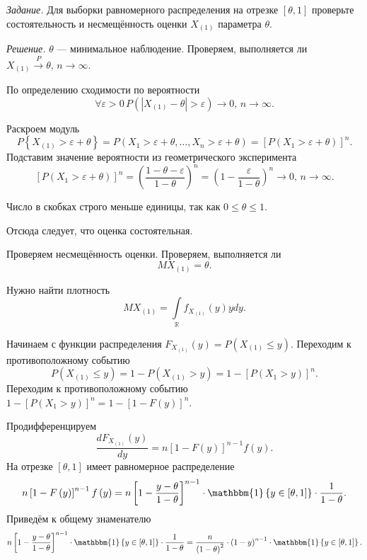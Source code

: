 \textit{Задание.}
Для выборки равномерного распределения на отрезке $ \left[ \theta , 1 \right] $
проверьте состоятельность и несмещённость оценки $X_{ \left( 1 \right) }$ параметра $ \theta $.

\textit{Решение.} $ \theta $ --- минимальное наблюдение.
Проверяем,
выполняется ли $X_{ \left( 1 \right) } \overset{P}{ \rightarrow } \theta, \, n \to \infty $.

По определению сходимости по вероятности
$$ \forall \varepsilon > 0 \,
  P \left( \left| X_{ \left( 1 \right) } - \theta \right| > \varepsilon \right) \to 0, \,
  n \to \infty.$$

Раскроем модуль
$$P \left\{ X_{ \left( 1 \right) } > \varepsilon + \theta \right\} =
  P \left( X_1 > \varepsilon + \theta, \dotsc, X_n > \varepsilon + \theta \right) =
  \left[ P \left( X_1 > \varepsilon + \theta \right) \right]^n.$$
Подставим значение вероятности из геометрического эксперимента
$$ \left[ P \left( X_1 > \varepsilon + \theta \right) \right]^n =
  \left( \frac{1 - \theta - \varepsilon }{1 - \theta } \right)^n =
  \left( 1 - \frac{ \varepsilon }{1 - \theta } \right)^n \to
  0, \,
  n \to \infty.$$

Число в скобках строго меньше единицы, так как $0 \leq \theta \leq 1$.

Отсюда следует, что оценка состоятельная.

Проверяем несмещённость оценки.
Проверяем, выполняется ли
$$MX_{ \left( 1 \right) } =
  \theta.$$

Нужно найти плотность
$$MX_{ \left( 1 \right) } =
  \int \limits_{ \mathbb{R}} f_{X_{ \left( 1 \right) }} \left( y \right) ydy.$$

Начинаем с функции распределения
$F_{X_{ \left( 1 \right) }} \left( y \right) =
  P \left( X_{ \left( 1 \right) } \leq y \right) $.
Переходим к противоположному событию
$$P \left( X_{ \left( 1 \right) } \leq y \right) =
  1 - P \left( X_{ \left( 1 \right) } > y \right) =
  1 - \left[ P \left( X_1 > y \right) \right]^n.$$
Переходим к противоположному событию
$1 - \left[ P \left( X_1 > y \right) \right]^n =
  1 - \left[ 1 - F \left( y \right) \right]^n$.

Продифференцируем
$$ \frac{dF_{X_{ \left( 1 \right) }} \left( y \right) }{dy} =
  n \left[ 1 - F \left( y \right) \right]^{n - 1} f \left( y \right).$$
На отрезке $ \left[ \theta, 1 \right] $ имеет равномерное распределение
$$n \left[ 1 - F \left( y \right) \right]^{n - 1} f \left( y \right) =
  n \left[ 1 - \frac{y - \theta }{1 - \theta } \right]^{n - 1} \cdot
  \mathbbm{1} \left\{ y \in \left[ \theta, 1 \right] \right\} \cdot \frac{1}{1 - \theta }.$$
Приведём к общему знаменателю
$$n \left[ 1 - \frac{y - \theta }{1 - \theta } \right]^{n - 1} \cdot
  \mathbbm{1} \left\{ y \in \left[ \theta, 1 \right] \right\} \cdot \frac{1}{1 - \theta } =
  \frac{n}{ \left( 1 - \theta \right)^2} \cdot \left( 1 - y \right)^{n - 1} \cdot
  \mathbbm{1} \left\{ y \in \left[ \theta, 1 \right] \right\}.$$

